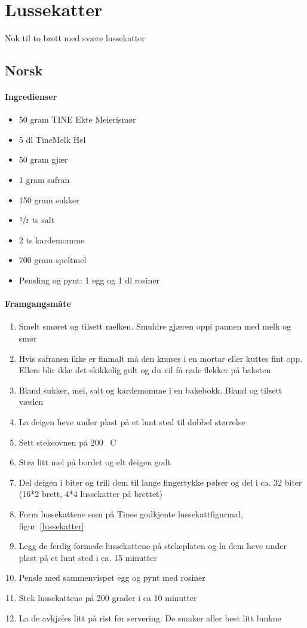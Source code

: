 \section{Lussekatter}
Nok til to brett med svære lussekatter
\subsection{Norsk}

\paragraph{Ingredienser}
\begin{itemize}[noitemsep]
  \item 50 gram TINE Ekte Meierismør
  \item 5 dl TineMelk Hel
  \item 50 gram gjær
  \item 1 gram safran
  \item 150 gram sukker
  \item $\sfrac{1}{2}$ ts salt
  \item 2 ts kardemomme
  \item 700 gram speltmel
  \item Pensling og pynt: 1 egg og 1 dl rosiner
\end{itemize}

\paragraph{Framgangsmåte}
\begin{enumerate}[noitemsep]
  \item Smelt smøret og tilsett melken. Smuldre gjæren oppi pannen med melk og smør
  \item Hvis safranen ikke er finmalt må den knuses i en mortar eller kuttes fint opp. Ellers blir ikke det skikkelig gult og du vil få røde flekker på baksten
  \item Bland sukker, mel, salt og kardemomme i en bakebokk. Bland og tilsett væslen
  \item La deigen heve under plast på et lunt sted til dobbel størrelse
  \item Sett stekeovnen på 200 \degree~C
  \item Strø litt mel på bordet og elt deigen godt
  \item Del deigen i biter og trill dem til lange fingertykke pølser og del i ca. 32 biter (16*2 brett, 4*4 lussekatter på brettet)
  \item Form lussekattene som på Tines godkjente lussekattfigurmal, figur~\ref{lussekatter}
  \item Legg de ferdig formede lussekattene på stekeplaten og la dem heve under plast på et lunt sted i ca. 15 minutter
  \item Pensle med sammenvispet egg og pynt med rosiner
  \item Stek lussekattene på 200 grader i  ca 10 minutter
  \item La de avkjøles litt på rist før servering. De smaker aller best litt lunkne
\end{enumerate}

